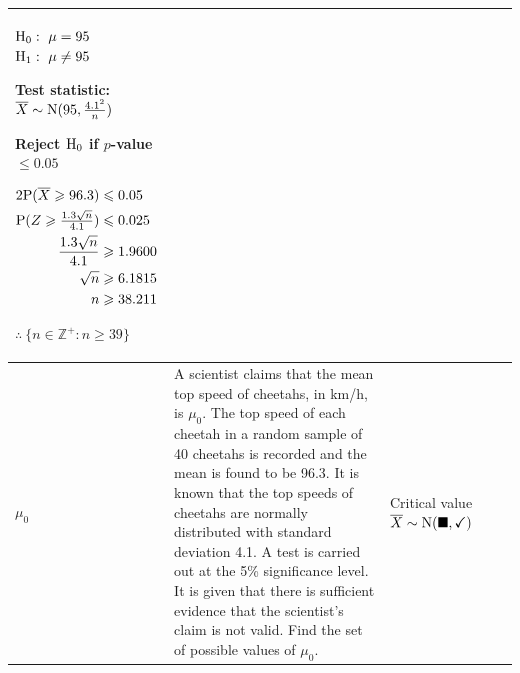 \begin{landscape}
{\begin{longtable}{|M{1.0cm}|L{5.0cm}|L{2.3cm}|L{6.4cm}|L{6.4cm}|}
$\mathrm{H}_{0}:\ \mu=95$\newline $\mathrm{H}_{1}:\ \mu\neq95$\par\smallskip Test statistic:\newline $\overline{X}\sim\mathrm{N}(95,\tfrac{4.1^{2}}{n})$\par{\centering{}\par}Reject $\mathrm{H}_{0}$ if $p$-value $\leqslant0.05$\par\smallskip $\begin{aligned}2\mathrm{P}(\overline{X}\geqslant96.3)&\leqslant0.05\\\mathrm{P}(Z\geqslant\tfrac{1.3\sqrt{n}}{4.1})&\leqslant0.025\\\dfrac{1.3\sqrt{n}}{4.1}&\geqslant1.9600\\\sqrt{n}&\geqslant6.1815\\n&\geqslant38.211\end{aligned}$\par\smallskip $\therefore\ \{n\in\mathbb{Z}^{+}:n\geqslant39\}$\\\hline
$\mu_{0}$ &
A scientist claims that the mean top speed of cheetahs, in km/h, is $\mu_{0}$. The top speed of each cheetah in a random sample of 40 cheetahs is recorded and the mean is found to be 96.3. It is known that the top speeds of cheetahs are normally distributed with standard deviation 4.1. A test is carried out at the 5\% significance level. It is given that there is sufficient evidence that the scientist's claim is not valid. Find the set of possible values of $\mu_{0}$. &
Critical value\newline $\overline{X}\sim\mathrm{N}(\blacksquare,\checkmark)$ &

\end{longtable}}
\end{landscape}
